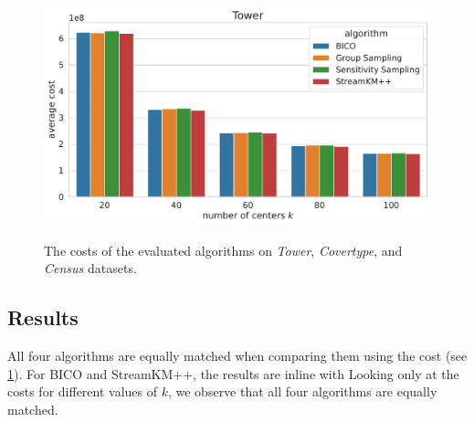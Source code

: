 \begin{figure}
  \includegraphics[width=.5\linewidth]{figures/costs-Tower.pdf}
  \newline \newline
  \newline \newline
  \newline \newline
  \label{fig:costs}
  \caption{The costs of the evaluated algorithms on \textit{Tower}, \textit{Covertype}, and \textit{Census} datasets.}
\end{figure}


\subsection{Results}
All four algorithms are equally matched when comparing them using the cost (see \cref{fig:costs}). For BICO and StreamKM++, the results are inline with 
Looking only at the costs for different values of $k$, we observe that all four algorithms are equally matched. 